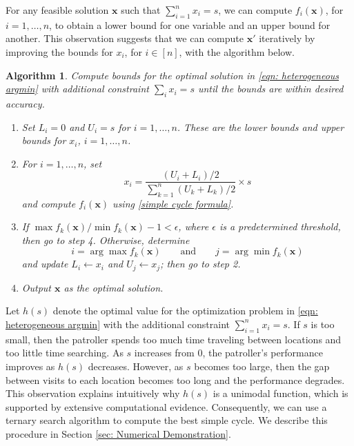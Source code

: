 \documentclass[11pt,a4paper]{article}
\newtheorem{alg}[theorem]{Algorithm}
\begin{document}
\bigskip

For any feasible solution $\mathbf{x}$ such that $\sum_{i=1}^n x_i = s$, we can compute $f_i(\mathbf{x})$, for $i=1,\ldots,n$, to obtain a lower bound for one variable and an upper bound for another.
This observation suggests that we can compute $\mathbf{x}'$ iteratively by improving the bounds for $x_i$, for $i \in [n]$, with the algorithm below.


\begin{alg}
\label{al:iteration}
Compute bounds for the optimal solution in \eqref{eqn: heterogeneous argmin} with additional constraint $\sum_i x_i = s$ until the bounds are within desired accuracy.
\begin{enumerate}
\item
Set $L_i=0$ and $U_i= s$ for $i=1,\ldots,n$.
These are the lower bounds and upper bounds for $x_i$, $i=1,\ldots,n$.
\item
For $i=1,\ldots,n$, set
\[
x_i = \frac{(U_i+L_i)/2}{\sum_{k=1}^n (U_k + L_k)/2} \times s
\]
and compute $f_i(\mathbf{x})$ using \eqref{simple cycle formula}.
\item
If $\max f_k(\mathbf{x}) / \min f_k(\mathbf{x}) -1 < \epsilon$, where $\epsilon$ is a predetermined threshold, then go to step 4.
Otherwise, determine
\[
i = \arg \max f_k(\mathbf{x}) \qquad \text{and} \qquad j = \arg \min f_k(\mathbf{x})
\]
and update $L_i \leftarrow x_i$ and $U_j \leftarrow x_j$; then go to step 2.
\item Output $\mathbf{x}$ as the optimal solution.
\end{enumerate}
\end{alg}


Let $h(s)$ denote the optimal value for the optimization problem in \eqref{eqn: heterogeneous argmin} with the additional constraint $\sum_{i=1}^n x_i = s$.
If $s$ is too small, then the patroller spends too much time traveling between locations and too little time searching.
As $s$ increases from 0, the patroller's performance improves as $h(s)$ decreases.
However, as $s$ becomes too large, then the gap between visits to each location becomes too long and the performance degrades.
This observation explains intuitively why $h(s)$ is a unimodal function, which is supported by extensive computational evidence.
Consequently, we can use a ternary search algorithm to compute the best simple cycle. We describe this procedure in Section \ref{sec: Numerical Demonstration}.
\end{document}
